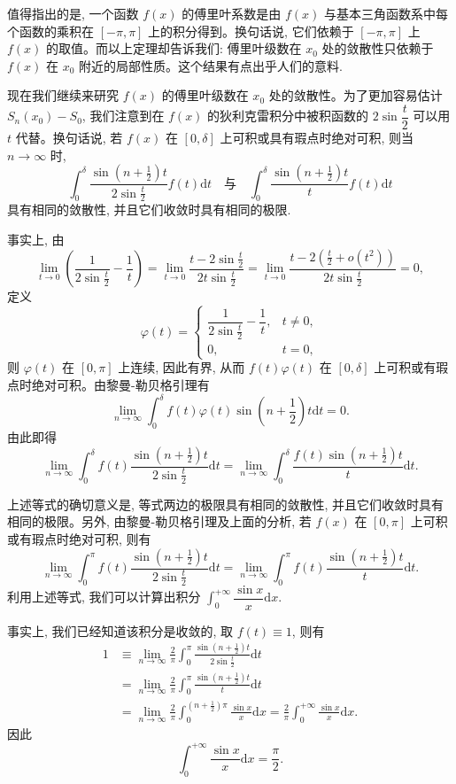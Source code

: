 值得指出的是, 一个函数 $f(x)$ 的傅里叶系数是由 $f(x)$ 与基本三角函数系中每个函数的乘积在 $[-\pi,\pi]$ 上的积分得到。换句话说, 它们依赖于 $[-\pi,\pi]$ 上 $f(x)$ 的取值。而以上定理却告诉我们: 傅里叶级数在 $x_0$ 处的敛散性只依赖于 $f(x)$ 在 $x_0$ 附近的局部性质。这个结果有点出乎人们的意料.

现在我们继续来研究 $f(x)$ 的傅里叶级数在 $x_0$ 处的敛散性。为了更加容易估计 $S_n(x_0)-S_0$, 我们注意到在 $f(x)$ 的狄利克雷积分中被积函数的 $2\sin\dfrac t2$ 可以用 $t$ 代替。换句话说, 若 $f(x)$ 在 $[0,\delta]$ 上可积或具有瑕点时绝对可积, 则当 $n\to\infty$ 时,
\[
  \int_0^\delta\frac{\sin\left(n+\frac12\right)t}{2\sin\frac t2}f(t)\mathrm dt
  \quad\text{与}\quad
  \int_0^\delta\frac{\sin\left(n+\frac12\right)t}{t}f(t)\mathrm dt
\]
具有相同的敛散性, 并且它们收敛时具有相同的极限.

事实上, 由
\[
  \lim_{t\to0}\left(\frac1{2\sin\frac t2}-\frac1t\right)
  =\lim_{t\to0}\frac{t-2\sin\frac t2}{2t\sin\frac t2}
  =\lim_{t\to0}\frac{t-2\left(\frac t2+o(t^2)\right)}{2t\sin\frac t2}=0,
\]
定义
\[
  \varphi(t)=
  \begin{cases}
    \dfrac1{2\sin\frac t2}-\dfrac1t, & t\ne0,\\
    0, & t=0,
  \end{cases}
\]
则 $\varphi(t)$ 在 $[0,\pi]$ 上连续, 因此有界, 从而 $f(t)\varphi(t)$ 在 $[0,\delta]$ 上可积或有瑕点时绝对可积。由黎曼-勒贝格引理有
\[
  \lim_{n\to\infty}\int_0^\delta f(t)\varphi(t)\sin\left(n+\frac12\right)t\mathrm dt=0.
\]
由此即得
\[
  \lim_{n\to\infty}\int_0^\delta f(t)\frac{\sin\left(n+\frac12\right)t}{2\sin\frac t2}\mathrm dt
  =
  \lim_{n\to\infty}\int_0^\delta\frac{f(t)\sin\left(n+\frac12\right)t}{t}\mathrm dt.
\]

\begin{remark}\label{remark:ma-12-source-17}
上述等式的确切意义是, 等式两边的极限具有相同的敛散性, 并且它们收敛时具有相同的极限。另外, 由黎曼-勒贝格引理及上面的分析, 若 $f(x)$ 在 $[0,\pi]$ 上可积或有瑕点时绝对可积, 则有
\[
  \lim_{n\to\infty}\int_0^\pi f(t)\frac{\sin\left(n+\frac12\right)t}{2\sin\frac t2}\mathrm dt
  =
  \lim_{n\to\infty}\int_0^\pi f(t)\frac{\sin\left(n+\frac12\right)t}{t}\mathrm dt.
\]
利用上述等式, 我们可以计算出积分 $\int_0^{+\infty}\dfrac{\sin x}{x}\mathrm dx$.
\end{remark}

事实上, 我们已经知道该积分是收敛的, 取 $f(t)\equiv1$, 则有
\[
\begin{aligned}
  1
  &\equiv\lim_{n\to\infty}\frac2\pi\int_0^\pi
    \frac{\sin\left(n+\frac12\right)t}{2\sin\frac t2}\mathrm dt\\
  &=\lim_{n\to\infty}\frac2\pi\int_0^\pi
    \frac{\sin\left(n+\frac12\right)t}{t}\mathrm dt\\
  &=\lim_{n\to\infty}\frac2\pi\int_0^{(n+\frac12)\pi}\frac{\sin x}{x}\mathrm dx
  =\frac2\pi\int_0^{+\infty}\frac{\sin x}{x}\mathrm dx.
\end{aligned}
\]
因此
\[
  \int_0^{+\infty}\frac{\sin x}{x}\mathrm dx=\frac{\pi}{2}.
\]

